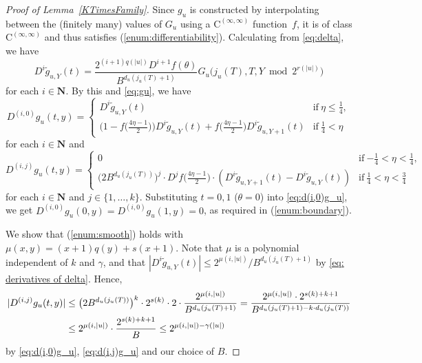 \documentclass{lmcs}
\theoremstyle{definition}
\theoremstyle{remark}
\newcommand{\N}{\mathbf N}
\newcommand{\D}{D}
\newcommand{\classC}{\mathrm C}
\begin{document}
\begin{proof}[Proof of Lemma~\ref{KTimesFamily}]
Since $g _u$ is constructed by interpolating between 
the (finitely many) values of $G _u$ 
using a $\classC^{(\infty, \infty)}$ function~$f$, 
it is of class $\classC^{(\infty, \infty)}$ 
and thus satisfies (\ref{enum:differentiability}).
Calculating from \eqref{eq:delta}, 
we have 
\begin{equation}
 \label{eq: derivatives of delta}
    \D^i \tilde g_{u,Y}(t) 
    = \frac{2^{(i+1)q(|u|)} \D^{i+1}f(\theta)}{B^{d_u(j_u(T)+1)}}
    G_u\bigl( j_u(T), T, Y \bmod 2^{r(|u|)} \bigr) 
\end{equation}
for each $i \in \N$. 
By this and \eqref{eq:gu}, 
we have
\begin{equation}
     \D^{(i, 0)} g_u(t, y)
     = \begin{cases}
 	\D^i \tilde g_{u, Y}(t) 
	& \text{if} \ \eta \le \frac 1 4, 
	\\
	\bigl( 1-f \bigl( \frac{4\eta-1}{2} \bigr) \bigr) 
	\D^i \tilde g_{u, Y}(t)
	+ f \bigl( \frac{4\eta-1}{2} \bigr) \D^i \tilde g_{u,Y+1}(t) 
	& \text{if} \ \frac 1 4 < \eta 
       \end{cases} \label{eq:d(i,0)g_u}
\end{equation}
for each $i \in \N$ and 
  \begin{equation} \label{eq:d(i,j)g_u}
    \D^{(i, j)} g_u(t, y)
     = \begin{cases}
	0 & \text{if} \ {-\frac 1 4} < \eta < \frac 1 4, \\
	\bigl( 2B^{d_u(j_u(T))} \bigr)^j \cdot \D^j f \bigl( \frac{4\eta - 1}2 \bigr) \cdot
	(\D^i \tilde g_{u,Y+1}(t)-\D^i \tilde g_{u, Y}(t)) 
	& \text{if} \ \frac 1 4 < \eta < \frac 3 4 
       \end{cases}
  \end{equation}
for each $i \in \N$ and $j \in \{1, \dots, k\}$. 
Substituting $t = 0, 1$ ($\theta = 0$) into \eqref{eq:d(i,0)g_u},
we get $\D^{(i, 0)} g_u(0,y) = \D^{(i, 0)} g_u(1,y) = 0$, 
as required in (\ref{enum:boundary}).

We show that (\ref{enum:smooth}) holds with $\mu(x, y) = (x+1)q(y) + s(x+1)$.
Note that $\mu$ is a polynomial independent of $k$ and $\gamma$, 
and that $
 |\D^i \tilde g_{u,Y}(t)| 
\leq
 2 ^{\mu (i, \lvert u \rvert)} / B ^{d _u (j _u (T) + 1)}
$ by \eqref{eq: derivatives of delta}. 
Hence, 
\begin{align}
\label{equation: upperbound of differences}
  |\D^{(i,j)} g _u (t, y)| 
&
 \le 
    \bigl( 2 B^{d_u (j _u (T))} \bigr) ^k \cdot 2^{s(k)}
   \cdot 
    2 \cdot \frac{2 ^{\mu (i, \lvert u \rvert)}}{B ^{d _u (j _u (T) + 1)}} 
 =
   \frac{2 ^{\mu (i, \lvert u \rvert)} \cdot 2^{s(k) + k + 1}}{B ^{d _u (j _u (T) + 1) - k \cdot d _u (j _u (T))}} 
\notag
\\
&
 \le
   2 ^{\mu (i, \lvert u \rvert)} \cdot \frac{2^{s(k) + k + 1}}{B}
 \le
   2^{\mu(i, |u|) - \gamma(|u|)}
\end{align}
by \eqref{eq:d(i,0)g_u}, \eqref{eq:d(i,j)g_u} and our choice of $B$.


\end{proof}
\end{document}
